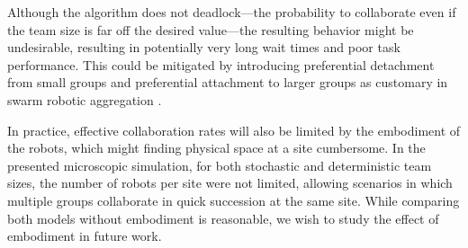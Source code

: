 \documentclass[Main.tex]{subfiles}
\begin{document}
Although the algorithm does not deadlock---the probability to collaborate even if the team size is far off the desired value---the resulting behavior might be undesirable, resulting in potentially very long wait times and poor task performance. This could be mitigated by introducing preferential detachment from small groups and preferential attachment to larger groups as customary in swarm robotic aggregation \cite{correll2011modeling}.

In practice, effective collaboration rates will also be limited by the embodiment of the robots, which might finding physical space at a site cumbersome. In the presented microscopic simulation, for both stochastic and deterministic team sizes, the number of robots per site were not limited, allowing scenarios in which multiple groups collaborate in quick succession at the same site. While comparing both models without embodiment is reasonable, we wish to study the effect of embodiment in future work.
\end{document}
